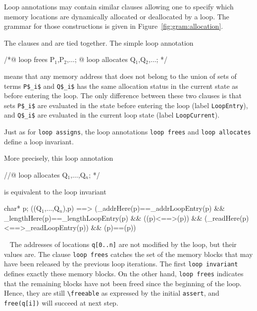 Loop annotations may contain similar clauses allowing one to specify which
memory locations
are dynamically allocated or deallocated by a loop.
The grammar for those constructions is given in
 Figure~\ref{fig:gram:allocation}.

The clauses \Loop \allocates and \Loop \frees are tied together.
The simple loop annotation
\begin{listing-nonumber}
/*@ loop frees P$_1$,P$_2$,$\dots$;
  @ loop allocates Q$_1$,Q$_2$,$\dots$; */
\end{listing-nonumber}
means that any memory address that does not belong to the union of sets of
terms
\lstinline|P$_i$| and  \lstinline|Q$_i$|
has the same allocation status in the current state as
before entering the loop.
The only difference between these two clauses is that sets
\lstinline|P$_i$| are evaluated in the state before entering the loop
(label \lstinline|LoopEntry|),
and \lstinline|Q$_i$| are evaluated in the current loop state
(label \lstinline|LoopCurrent|).

Just as for \lstinline|loop assigns|, the loop annotations
\lstinline|loop frees| and \lstinline|loop allocates| define a loop invariant.

More precisely, this loop annotation
\begin{listing-nonumber}
//@ loop allocates Q$_1$,$\dots$,Q$_n$; */
\end{listing-nonumber}
is equivalent to the loop invariant
\begin{listing-nonumber}
\forall char* p;
\separated(\union(Q$_1$,$\ldots$,Q$_n$),p) ==>
   (\base_addr{Here}(p)==\base_addr{LoopEntry}(p)
    && \block_length{Here}(p)==\block_length{LoopEntry}(p)
    && ((p)<==>(p))
    && (\valid_read{Here}(p)<==>\valid_read{LoopEntry}(p))
    && (p)==(p))
\end{listing-nonumber}

\begin{example}
~
The addresses of locations \lstinline|q[0..n]| are not modified by the loop,
but their values are.
The clause \lstinline|loop frees| catches the set of the memory blocks
that may have been released by the previous loop iterations.
The first \lstinline|loop invariant| defines exactly these memory blocks.
On the other hand, \lstinline|loop frees| indicates that the remaining blocks
have not been freed since the beginning of the loop. Hence, they are still
\lstinline|\freeable| as expressed by the initial \lstinline|assert|, and
\lstinline|free(q[i])| will succeed at next step.
\end{example}

